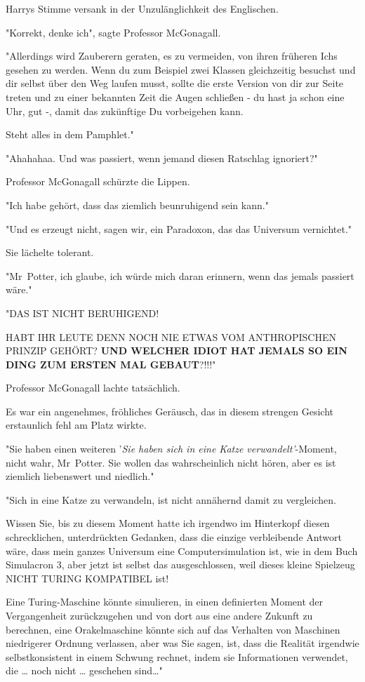 {Harrys Stimme versank in der Unzulänglichkeit des Englischen.

"Korrekt, denke ich", sagte Professor McGonagall.

"Allerdings wird Zauberern geraten, es zu vermeiden, von ihren früheren Ichs gesehen zu werden. Wenn du zum Beispiel zwei Klassen gleichzeitig besuchst und dir selbst über den Weg laufen musst, sollte die erste Version von dir zur Seite treten und zu einer bekannten Zeit die Augen schließen - du hast ja schon eine Uhr, gut -, damit das zukünftige Du vorbeigehen kann.

Steht alles in dem Pamphlet."

"Ahahahaa. Und was passiert, wenn jemand diesen Ratschlag ignoriert?"

Professor McGonagall schürzte die Lippen.

"Ich habe gehört, dass das ziemlich beunruhigend sein kann."

"Und es erzeugt nicht, sagen wir, ein Paradoxon, das das Universum vernichtet."

Sie lächelte tolerant.

"Mr~Potter, ich glaube, ich würde mich daran erinnern, wenn das jemals passiert wäre."

"DAS IST NICHT BERUHIGEND!

HABT IHR LEUTE DENN NOCH NIE ETWAS VOM ANTHROPISCHEN PRINZIP GEHÖRT? \textbf{UND WELCHER IDIOT HAT JEMALS SO EIN DING ZUM ERSTEN MAL GEBAUT}?!!!"

Professor McGonagall lachte tatsächlich.

Es war ein angenehmes, fröhliches Geräusch, das in diesem strengen Gesicht erstaunlich fehl am Platz wirkte.

"Sie haben einen weiteren '\emph{Sie haben sich in eine Katze verwandelt'}-Moment, nicht wahr, Mr~Potter. Sie wollen das wahrscheinlich nicht hören, aber es ist ziemlich liebenswert und niedlich."

"Sich in eine Katze zu verwandeln, ist nicht annähernd damit zu vergleichen.

Wissen Sie, bis zu diesem Moment hatte ich irgendwo im Hinterkopf diesen schrecklichen, unterdrückten Gedanken, dass die einzige verbleibende Antwort wäre, dass mein ganzes Universum eine Computersimulation ist, wie in dem Buch Simulacron 3, aber jetzt ist selbst das ausgeschlossen, weil dieses kleine Spielzeug NICHT TURING KOMPATIBEL ist!

Eine Turing-Maschine könnte simulieren, in einen definierten Moment der Vergangenheit zurückzugehen und von dort aus eine andere Zukunft zu berechnen, eine Orakelmaschine könnte sich auf das Verhalten von Maschinen niedrigerer Ordnung verlassen, aber was Sie sagen, ist, dass die Realität irgendwie selbstkonsistent in einem Schwung rechnet, indem sie Informationen verwendet, die … noch nicht … geschehen sind…"

}
